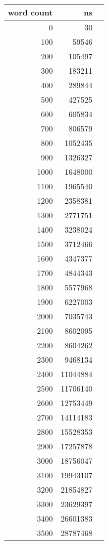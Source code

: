 \begin{figure}[H]
    \centering
    \footnotesize
    \begin{tabular}{r r r}
        \toprule
        \textbf{word count} & \textbf{ns} \\
        \midrule
        0 & 30 \\
        100 & 59546 \\
        200 & 105497 \\
        300 & 183211 \\
        400 & 289844 \\
        500 & 427525 \\
        600 & 605834 \\
        700 & 806579 \\
        800 & 1052435 \\
        900 & 1326327 \\
        1000 & 1648000 \\
        1100 & 1965540 \\
        1200 & 2358381 \\
        1300 & 2771751 \\
        1400 & 3238024 \\
        1500 & 3712466 \\
        1600 & 4347377 \\
        1700 & 4844343 \\
        1800 & 5577968 \\
        1900 & 6227003 \\
        2000 & 7035743 \\
        2100 & 8602095 \\
        2200 & 8604262 \\
        2300 & 9468134 \\
        2400 & 11044884 \\
        2500 & 11706140 \\
        2600 & 12753449 \\
        2700 & 14114183 \\
        2800 & 15528353 \\
        2900 & 17257878 \\
        3000 & 18756047 \\
        3100 & 19943107 \\
        3200 & 21854827 \\
        3300 & 23629397 \\
        3400 & 26601383 \\
        3500 & 28787468 \\

\end{tabular}
\end{figure}
